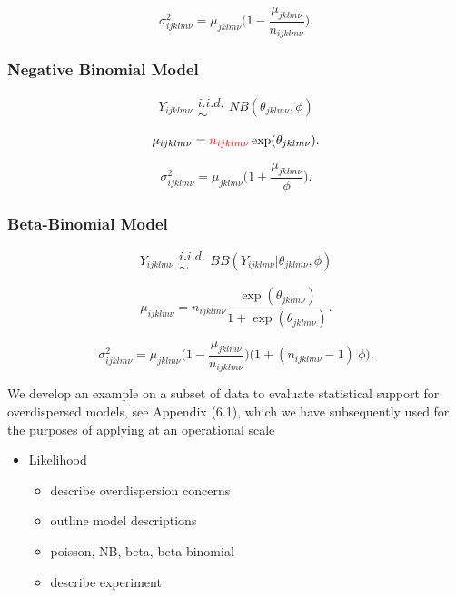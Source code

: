 \documentclass[12pt]{article}
\begin{document}
%
\begin{equation}
\sigma^2_{ijklm\nu} = \mu_{jklm\nu}\Big(1-\frac{\mu_{jklm\nu}}{n_{ijklm\nu}}\Big).
\end{equation}

%
\subsubsection{Negative Binomial Model}

%
\begin{equation}
Y_{ijklm\nu} \substack{i.i.d.\\\sim} NB(\theta_{jklm\nu}, \phi)
\end{equation}

%
\begin{equation}
\mu_{ijklm\nu} = {\color{red}n_{ijklm\nu}} \exp(\theta_{jklm\nu}).
\end{equation}

%
\begin{equation}
\sigma^2_{ijklm\nu} = \mu_{jklm\nu}\Big(1+\frac{\mu_{jklm\nu}}{\phi}\Big).
\end{equation}

%
\subsubsection{Beta-Binomial Model}

%
\begin{equation}
Y_{ijklm\nu} \substack{i.i.d.\\\sim} BB(Y_{ijklm\nu}|\theta_{jklm\nu}, \phi)
\end{equation}

%
\begin{equation}
\mu_{ijklm\nu} = n_{ijklm\nu}\frac{\exp(\theta_{jklm\nu})}{1+\exp(\theta_{jklm\nu})}.
\end{equation}

%
\begin{equation}
\sigma^2_{ijklm\nu} = \mu_{jklm\nu}\Big(1-\frac{\mu_{jklm\nu}}{n_{ijklm\nu}}\Big)\Big(1+(n_{ijklm\nu}-1)~\phi\Big).
\end{equation}


We develop an example on a subset of data to evaluate statistical support for 
overdispersed models, see Appendix (6.1), which we have subsequently used for the purposes of applying at an operational scale 

\begin{itemize}
\item Likelihood
	\begin{itemize}
	\item describe overdispersion concerns
	\item outline model descriptions
	\item poisson, NB, beta, beta-binomial
	\item describe experiment
	\end{itemize}
\end{itemize}
\end{document}
